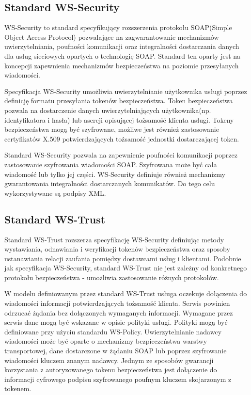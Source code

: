 	\subsection{Standard WS-Security}

		WS-Security to standard specyfikujący rozszerzenia protokołu SOAP(Simple Object Access Protocol) pozwalające na zagwarantowanie mechanizmów uwierzytelniania, poufności komunikacji oraz integralności dostarczania danych dla usług sieciowych opartych o technologię SOAP. Standard ten oparty jest na koncepcji zapewnienia mechanizmów bezpieczeństwa na poziomie przesyłanych wiadomości\cite{Hallam03}. 

		Specyfikacja WS-Security umożliwia uwierzytelnianie użytkownika usługi poprzez definicję formatu przesyłania tokenów bezpieczeństwa. Token bezpieczeństwa pozwala na dostarczenie danych uwierzytelniających użytkownika(np. identyfikatora i hasła) lub asercji opisującej tożsamość klienta usługi. Tokeny bezpieczeństwa mogą być szyfrowane, możliwe jest również zastosowanie certyfikatów X.509 potwierdzających tożsamość jednostki dostarczającej token. 

		Standard WS-Security pozwala na zapewnienie poufności komunikacji poprzez zastosowanie szyfrowania wiadomości SOAP. Szyfrowana może być cała wiadomość lub tylko jej części. WS-Security definiuje również mechanizmy gwarantowania integralności dostarczanych komunikatów. Do tego celu wykorzystywane są podpisy XML. 

	\subsection{Standard WS-Trust}

		Standard WS-Trust rozszerza specyfikację WS-Security definiując metody wystawiania, odnawiania i weryfikacji tokenów bezpieczeństwa oraz sposoby ustanawiania relacji zaufania pomiędzy dostawcami usług i klientami. Podobnie jak specyfikacja WS-Security, standard WS-Trust nie jest zależny od konkretnego protokołu bezpieczeństwa - umożliwia zastosowanie różnych protokołów\cite{WS-Trust-1.4-with-errata}.

		W modelu definiowanym przez standard WS-Trust usługa oczekuje dołączenia do wiadomości informacji potwierdzających tożsamość klienta. Serwis powinien odrzucać żądania bez dołączonych wymaganych informacji. Wymagane przez serwis dane mogą być wskazane w opisie polityki usługi. Polityki mogą być definiowane przy użyciu standardu WS-Policy. Uwierzytelnianie nadawcy wiadomości może być oparte o mechanizmy bezpieczeństwa warstwy transportowej, dane dostarczone w żądaniu SOAP lub poprzez szyfrowanie wiadomości kluczem znanym nadawcy. Jednym ze sposobów gwarancji korzystania z autoryzowanego tokenu bezpieczeństwa jest dołączenie do informacji cyfrowego podpisu szyfrowanego poufnym kluczem skojarzonym z tokenem.

